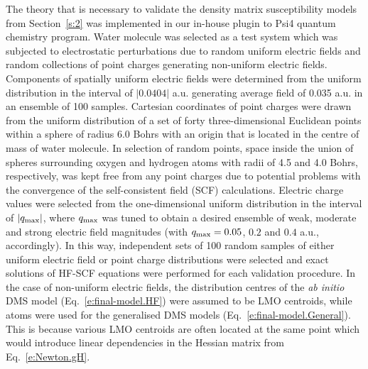 \documentclass[aip,amsmath,amssymb,reprint,floatfix]{revtex4-1}
\begin{document}
The theory that is necessary to validate the density matrix susceptibility models from Section~\ref{s:2}
was implemented in our in\hyp{}house plugin to {\sc Psi4} quantum chemistry program.\cite{Psi4.JCTC.2017}
Water molecule was selected as a test system which was subjected to 
electrostatic perturbations due to random uniform electric fields and random collections of point charges
generating non\hyp{}uniform electric fields.
Components of spatially uniform electric fields were determined 
from the uniform distribution in the interval 
of $\vert 0.0404 \vert$ a.u. generating average field of 0.035 a.u. in an ensemble of 100 samples.
Cartesian coordinates of point charges were drawn from the uniform distribution 
of a set of forty three\hyp{}dimensional Euclidean points within a sphere of radius 6.0 Bohrs
with an origin that is located in the centre of mass of water molecule.
In selection of random points, space inside the union of spheres surrounding
oxygen and hydrogen atoms with radii of 4.5 and 4.0 Bohrs, respectively, was
kept free from any point charges due to potential problems with the convergence of the 
self\hyp{}consistent field (SCF) calculations.
Electric charge values were selected from the one\hyp{}dimensional uniform distribution
in the interval of $\vert q_{\rm max} \vert$, where $q_{\rm max}$
was tuned to obtain a desired ensemble of weak, moderate and strong electric field magnitudes
(with $q_{\rm max}=0.05$, $0.2$ and $0.4$ a.u., accordingly).
In this way, independent sets of 100 random samples of either uniform electric field or
point charge distributions were selected and exact solutions of HF\hyp{}SCF equations were 
performed for each validation procedure.
In the case of non\hyp{}uniform electric fields, the distribution centres 
of the \emph{ab initio} DMS model (Eq.~\eqref{e:final-model.HF}) were assumed 
to be LMO centroids, while atoms were used for the generalised DMS models (Eq.~\eqref{e:final-model.General}).
This is because various LMO centroids are often located at the same point which would
introduce linear dependencies in the Hessian matrix from Eq.~\eqref{e:Newton.gH}.
\end{document}

